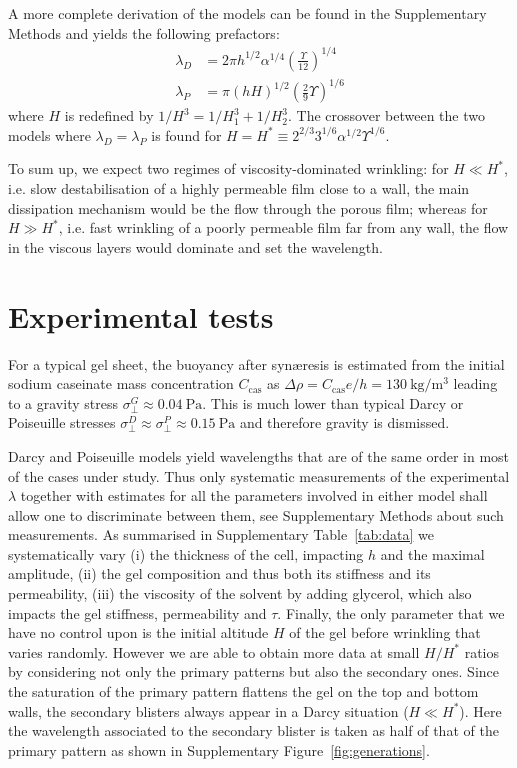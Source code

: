 \documentclass[twocolumn,superscriptaddress,showpacs,preprintnumbers,
amsmath,amssymb,prl]{revtex4-1}
\begin{document}
A more complete derivation of the models can be found in the Supplementary Methods and yields the following prefactors:
\begin{align}
\lambda_D &= 2\pi h^{1/2}\alpha^{1/4}\left(\frac{\Upsilon}{12}\right)^{1/4}\\
\lambda_P &= \pi (hH)^{1/2}\left(\frac{2}{9}\Upsilon\right)^{1/6}
\end{align}
where $H$ is redefined by $1/H^3 = 1/H_1^3 + 1/H_2^3$. The crossover between the two models where $\lambda_D=\lambda_P$ is found for $H = H^* \equiv 2^{2/3} 3^{1/6} \alpha^{1/2} \Upsilon^{1/6}$.

To sum up, we expect two regimes of viscosity-dominated wrinkling: for $H\ll H^*$, i.e. slow destabilisation of a highly permeable film close to a wall, the main dissipation mechanism would be the flow through the porous film; whereas for $H\gg H^*$, i.e. fast wrinkling of a poorly permeable film far from any wall, the flow in the viscous layers would dominate and set the wavelength.

\section*{Experimental tests}

For a typical gel sheet, the buoyancy after syn\ae{}resis is estimated from the initial sodium caseinate mass concentration $C_\text{cas}$ as $\Delta\rho=C_\text{cas} e/h = \SI{130}{\kilo\gram\per\cubic\metre}$ leading to a gravity stress $\sigma_\perp^G \approx \SI{0.04}{\pascal}$. This is much lower than typical Darcy or Poiseuille stresses $\sigma_\perp^D \approx \sigma_\perp^P \approx \SI{0.15}{\pascal}$ and therefore gravity is dismissed.


Darcy and Poiseuille models yield wavelengths that are of the same order in most of the cases under study. Thus only systematic measurements of the experimental $\lambda$ together with estimates for all the parameters involved in either model shall allow one to discriminate between them, see Supplementary Methods about such measurements. As summarised in Supplementary Table~\ref{tab:data} we systematically vary (i) the thickness of the cell, impacting $h$ and the maximal amplitude, (ii) the gel composition and thus both its stiffness and its permeability, (iii) the viscosity of the solvent by adding glycerol, which also impacts the gel stiffness, permeability and $\tau$. Finally, the only parameter that we have no control upon is the initial altitude $H$ of the gel before wrinkling that varies randomly. However we are able to obtain more data at small $H/H^*$ ratios by considering not only the primary patterns but also the secondary ones. Since the saturation of the primary pattern flattens the gel on the top and bottom walls, the secondary blisters always appear in a Darcy situation ($H\ll H^*$). Here the wavelength associated to the secondary blister is taken as half of that of the primary pattern as shown in Supplementary Figure~\ref{fig:generations}.
\end{document}
